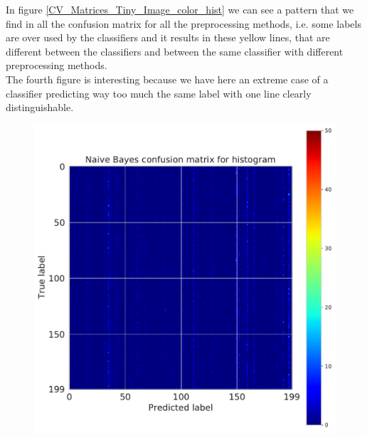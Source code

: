 \documentclass[11pt]{article}
\begin{document}
In figure \ref{CV_Matrices_Tiny_Image_color_hist} we can see a pattern that we find in all the confusion matrix for all the preprocessing methods, i.e. some labels are over used by the classifiers and it results in these yellow lines, that are different between the classifiers and between the same classifier with different preprocessing methods.\\
The fourth figure is interesting because we have here an extreme case of a classifier predicting way too much the same label with one line clearly distinguishable. \\

\begin{figure}[H]
\begin{minipage}[c]{0.5\textwidth}
\includegraphics[width=1\linewidth]{figures/Tiny_Image/CM__NB_histogram.pdf}
\end{minipage}
\begin{minipage}[c]{0.5\textwidth}

\end{minipage}
\end{figure}
\end{document}
